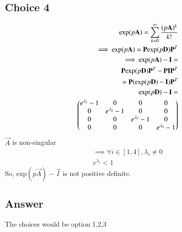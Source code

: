 \documentclass[journal,12pt,twocolumn]{IEEEtran}
\begin{document}
\subsection{Choice 4}
\begin{align}
    \text{exp}(p\mathbf{A})=\sum_{k=0}^\infty \frac{(p\mathbf{A})^k}{k!}\\
     \implies \text{exp}(p\mathbf{A})=\mathbf{P} \text{exp}(p\mathbf{D})\mathbf{P}^T\\
     \implies  \text{exp}(p\mathbf{A})-\mathbf{I}=\\\mathbf{P} \text{exp}(p\mathbf{D})\mathbf{P}^T-\mathbf{P}\mathbf{I}\mathbf{P}^T\\
     =\mathbf{P}( \text{exp}(p\mathbf{D})-\mathbf{I}) \mathbf{P}^T\\
     \text{exp}(p\mathbf{D})-\mathbf{I}=\\\begin{pmatrix}e^{\lambda_1}-1&0&0&0\\0&e^{\lambda_2}-1&0&0\\0&0&e^{\lambda_3}-1&0\\0&0&0&e^{\lambda_4}-1\end{pmatrix}
\end{align}
$\vec{A}$ is non-singular
\begin{align}
   \implies \forall i \in [1,4], \lambda_i\neq0\\
   e^{\lambda_i}<1
\end{align}
So, exp$(p\vec{A})-\vec{I}$ is not positive definite.
\subsection{Answer}
The choices would be option 1,2,3
\end{document}
